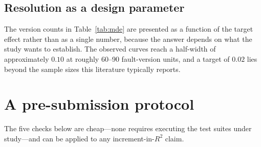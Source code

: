 \documentclass[preprint,12pt]{elsarticle}
\begin{document}
\subsection{Resolution as a design parameter}

The version counts in Table~\ref{tab:mde} are presented as a function of
the target effect rather than as a single number, because the answer
depends on what the study wants to establish. The observed curves reach a
half-width of approximately $0.10$ at roughly 60--90 fault-version units,
and a target of $0.02$ lies beyond the sample sizes this literature
typically reports.

\section{A pre-submission protocol}
\label{sec:protocol}

The five checks below are cheap---none requires executing the test suites
under study---and can be applied to any increment-in-$R^2$ claim.
\end{document}
